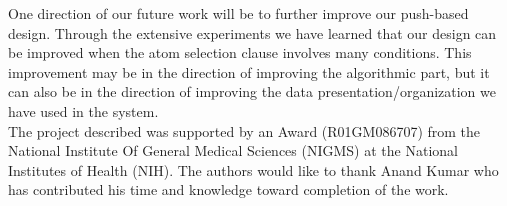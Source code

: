 \documentclass[10pt,journal,final,letterpaper,twocolumn]{IEEEtran}
\begin{document}
One direction of our future work will be to further improve our
push-based design. Through the extensive experiments we have learned
that our design can be improved when the atom selection clause
involves many conditions. This improvement may be in the direction
of improving the algorithmic part, but it can also be in the
direction of improving the data presentation/organization we have
used in the system.\\



 The project described was supported
by an Award (R01GM086707) from the National Institute Of General
Medical Sciences (NIGMS) at the National Institutes of Health (NIH).
The authors would like to thank Anand Kumar who has contributed his
time and knowledge toward completion of the work.





\clearpage


\appendices

\end{document}
